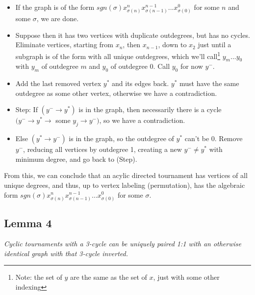 \documentclass[11pt, oneside]{article} 	%
\begin{document}
\begin{itemize}
\item If the graph is of the form $sgn(\sigma) x_{\sigma(n)}^nx_{\sigma(n-1)}^{n-1}  ... x_{\sigma(0)}^{0}$ for some $n$ and some $\sigma$, we are done.
\item Suppose then it has two vertices with duplicate outdegrees, but has no cycles. Eliminate vertices, starting from $x_n$, then $x_{n-1}$, down to $x_2$ just until a subgraph is of the form with all unique outdegrees, which we'll call\footnote{Note: the set of $y$ are the same as the set of $x$, just with some other indexing} $y_{m} ... y_0$ with $y_m$ of outdegree $m$ and $y_0$ of outdegree 0.  Call $y_0$ for now $y^-$.
\item Add the last removed vertex $y^*$ and its edges back.  $y^*$ must have the same outdegree as some other vertex, otherwise we have a contradiction.
\item Step: If $(y^- \rightarrow y^*)$ is in the graph, then necessarily there is a cycle $(y^- \rightarrow y^* \rightarrow $ some $y_j \rightarrow y^-)$, so we have a contradiction.
\item Else $(y^* \rightarrow y^-)$ is in the graph, so the outdegree of $y^*$ can't be 0.  Remove $y^-$, reducing all vertices by outdegree 1, creating a new $y^- \neq y^*$ with minimum degree, and go back to (Step).
\end{itemize}

From this, we can conclude that an acylic directed tournament has vertices of all unique degrees, and thus, up to vertex labeling (permutation), has the algebraic form $sgn(\sigma) x_{\sigma(n)}^nx_{\sigma(n-1)}^{n-1}  ... x_{\sigma(0)}^{0}$  for some $\sigma$.

\subsection{Lemma 4}

\emph{Cyclic tournaments with a 3-cycle can be uniquely paired 1:1 with an otherwise identical graph with that 3-cycle inverted.}
\end{document}
